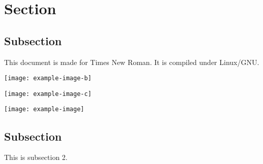 \documentclass[12pt,a4paper]{article}
\begin{document}
\section{Section}
\subsection{Subsection}
This document is made for Times New Roman. 
It is compiled under Linux/GNU.

\bigskip




\noindent\texttt{[image: example-image-b]} 

\noindent\texttt{[image: example-image-c]} 

\noindent\texttt{[image: example-image]}


\subsection{Subsection}
This is subsection 2. 
\end{document}

